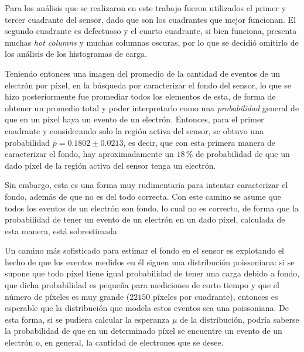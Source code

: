 Para los análisis que se realizaron en este trabajo fueron utilizados el primer y tercer cuadrante del sensor, dado que son los cuadrantes que mejor funcionan. El segundo cuadrante es defectuoso y el cuarto cuadrante, si bien funciona, presenta muchas \textit{hot columns} y muchas columnas oscuras, por lo que se decidió omitirlo de los análisis de los histogramas de carga.


Teniendo entonces una imagen del promedio de la cantidad de eventos de un electrón por píxel, en la búsqueda por caracterizar el fondo del sensor, lo que se hizo posteriormente fue promediar todos los elementos de esta, de forma de obtener un promedio total y poder interpretarlo como una \textit{probabilidad} general de que en un píxel haya un evento de un electrón. Entonces, para el primer cuadrante y considerando solo la región activa del sensor, se obtuvo una probabilidad $\bar{p} = 0.1802 \pm 0.0213$, es decir, que con esta primera manera de caracterizar el fondo, hay aproximadamente un $18\,\%$ de probabilidad de que un dado píxel de la región activa del sensor tenga un electrón.

Sin embargo, esta es una forma muy rudimentaria para intentar caracterizar el fondo, además de que no es del todo correcta. Con este camino se asume que todos los eventos de un electrón son fondo, lo cual no es correcto, de forma que la probabilidad de tener un evento de un electrón en un dado píxel, calculada de esta manera, está sobrestimada. 

Un camino más sofisticado para estimar el fondo en el sensor es explotando el hecho de que los eventos medidos en él siguen una distribución poissoniana: si se supone que todo píxel tiene igual probabilidad de tener una carga debido a fondo, que dicha probabilidad es pequeña para mediciones de corto tiempo y que el número de píxeles es muy grande ($22150$ píxeles por cuadrante), entonces es esperable que la distribución que modela estos eventos sea una poissoniana. De esta forma, si se pudiera calcular la esperanza $\mu$ de la distribución, podría saberse la probabilidad de que en un determinado píxel se encuentre un evento de un electrón o, en general, la cantidad de electrones que se desee.

